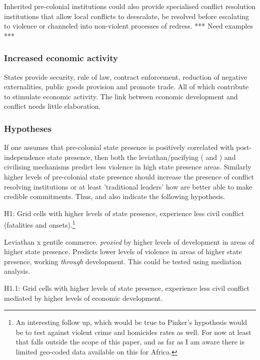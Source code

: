 \documentclass[12pt]{article}
\begin{document}
\begin{multicols}{2}
Inherited pre-colonial institutions could also provide specialised conflict
resolution institutions that allow local conflicts to deescalate, be resolved
before escalating to violence or channeled into non-violent processes of
redress. *** Need examples ***

\subsubsection{Increased economic activity}

States provide security, rule of law, contract enforcement, reduction of
negative externalities, public goods provision and promote trade. All of which
contribute to stimulate economic activity. The link between economic development
and conflict needs little elaboration. 


\subsubsection{Hypotheses}

If one assumes that pre-colonial state presence is positively correlated with
post-independence state presence, then both the leviathan/pacifying
(\citet{Tilly1990} and \citet{Pinker2012}) and civilising \citep{Pinker2012}
mechanisms predict less violence in high state presence areas. Similarly higher
levels of pre-colonial state presence should increase the presence of conflict
resolving institutions or at least 'traditional leaders' how are better able to
make credible commitments. Thus, \citet{Wig2016} and
\citet{Depetris-Chauvin2016} also indicate the following hypothesis.

H1: Grid cells with higher levels of state presence, experience less civil
conflict (fatalities and onsets).\footnote{An interesting follow up, which would
	be true to Pinker's hypothesis would be to test against violent crime
	and homicides rates as well. For now at least that falls outside the
	scope of this paper, and as far as I am aware there is limited geo-coded
data available on this for Africa.}

Leviathan x gentile commerce. \textit{proxied} by higher levels of development
in areas of higher state presence. Predicts lower levels of violence in areas of
higher state presence, working \textit{through} development. This could be
tested using mediation analysis.

H1.1: Grid cells with higher levels of state presence, experience less civil
conflict mediated by higher levels of economic development.


\end{multicols}
\end{document}
